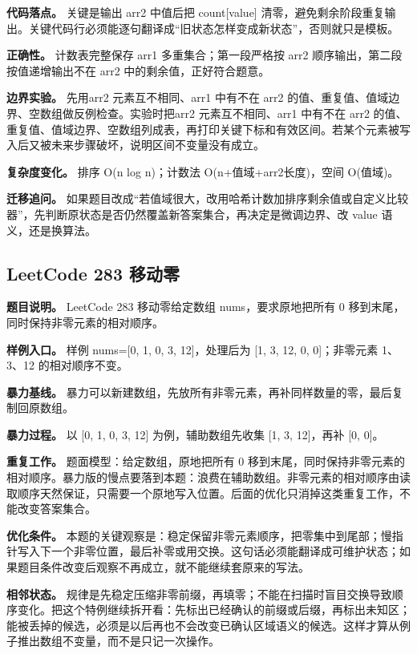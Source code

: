 \textbf{代码落点。} 关键是输出 arr2 中值后把 count[value] 清零，避免剩余阶段重复输出。关键代码行必须能逐句翻译成“旧状态怎样变成新状态”，否则就只是模板。

\textbf{正确性。} 计数表完整保存 arr1 多重集合；第一段严格按 arr2 顺序输出，第二段按值递增输出不在 arr2 中的剩余值，正好符合题意。

\textbf{边界实验。} 先用arr2 元素互不相同、arr1 中有不在 arr2 的值、重复值、值域边界、空数组做反例检查。实验时把arr2 元素互不相同、arr1 中有不在 arr2 的值、重复值、值域边界、空数组列成表，再打印关键下标和有效区间。若某个元素被写入后又被未来步骤破坏，说明区间不变量没有成立。

\textbf{复杂度变化。} 排序 O(n log n)；计数法 O(n+值域+arr2长度)，空间 O(值域)。

\textbf{迁移追问。} 如果题目改成“若值域很大，改用哈希计数加排序剩余值或自定义比较器”，先判断原状态是否仍然覆盖新答案集合，再决定是微调边界、改 value 语义，还是换算法。

\subsection{LeetCode 283 移动零}

\textbf{题目说明。} LeetCode 283 移动零给定数组 nums，要求原地把所有 0 移到末尾，同时保持非零元素的相对顺序。

\textbf{样例入口。} 样例 nums=[0, 1, 0, 3, 12]，处理后为 [1, 3, 12, 0, 0]；非零元素 1、3、12 的相对顺序不变。

\textbf{暴力基线。} 暴力可以新建数组，先放所有非零元素，再补同样数量的零，最后复制回原数组。

\textbf{暴力过程。} 以 [0, 1, 0, 3, 12] 为例，辅助数组先收集 [1, 3, 12]，再补 [0, 0]。

\textbf{重复工作。} 题面模型：给定数组，原地把所有 0 移到末尾，同时保持非零元素的相对顺序。暴力版的慢点要落到本题：浪费在辅助数组。非零元素的相对顺序由读取顺序天然保证，只需要一个原地写入位置。后面的优化只消掉这类重复工作，不能改变答案集合。

\textbf{优化条件。} 本题的关键观察是：稳定保留非零元素顺序，把零集中到尾部；慢指针写入下一个非零位置，最后补零或用交换。这句话必须能翻译成可维护状态；如果题目条件改变后观察不再成立，就不能继续套原来的写法。

\textbf{相邻状态。} 规律是先稳定压缩非零前缀，再填零；不能在扫描时盲目交换导致顺序变化。把这个特例继续拆开看：先标出已经确认的前缀或后缀，再标出未知区；能被丢掉的候选，必须是以后再也不会改变已确认区域语义的候选。这样才算从例子推出数组不变量，而不是只记一次操作。

